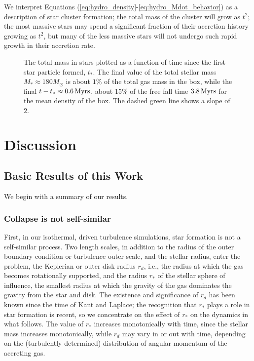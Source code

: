 \documentclass[../dissertation.tex]{subfiles}
\begin{document}
We interpret Equations (\ref{eq:hydro_density}-\ref{eq:hydro_Mdot_behavior}) as a description of star cluster formation; the total mass of the cluster will grow as $t^2$; the most massive stars may spend a significant fraction of their accretion history growing as $t^2$, but many of the less massive stars will not undergo such rapid growth in their accretion rate.  
%
\begin{figure}[htb]%
\caption[Hydro Mass Accretion rate over time]{The total mass in stars plotted as a function of time since the first star 
particle formed, $t_*$. The final value of the total stellar mass $M_*\approx180M_\odot$ 
is about $1\%$ of the total gas mass in the box, while the final $t-t_*\approx 0.6\,\rm Myrs$, 
about 15\% of the free fall time $3.8\,\rm Myrs$ for the mean density of the box. The dashed green line
shows a slope of $2$. \label{fig:hydro_M_t2}}
\end{figure}

%
\section{Discussion}\label{sec:hydro_discussion}
\subsection{Basic Results of this Work}
We begin with a summary of our results. 

\subsubsection{Collapse is not self-similar}
First, in our isothermal, 
driven turbulence simulations, star formation is not a self-similar process. 
Two length scales, in addition to the radius of the outer boundary condition or turbulence
outer scale,
and the stellar radius, enter the problem, the Keplerian or outer disk radius 
$r_d$, i.e., the radius at which the gas becomes rotationally supported, and 
the radius $r_*$ of the stellar sphere of influence, the smallest radius at 
which the gravity of the gas dominates the gravity from the star and disk. 
The existence and significance of $r_d$ has been known since the time of 
Kant and Laplace; the recognition that $r_*$ plays a role in star formation 
is recent, so we concentrate on the effect of $r_*$ on the dynamics in 
what follows. The value of $r_*$ increases monotonically with time, since 
the stellar mass increases monotonically, while $r_d$ may vary in or out 
with time, depending on the (turbulently determined) distribution of 
angular momentum of the accreting gas. 
\end{document}
